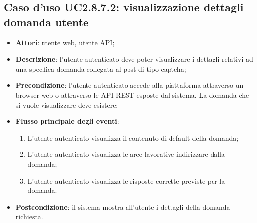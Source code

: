 \hypertarget{UC2.8.7.2}{}
\subsection{Caso d'uso UC2.8.7.2: visualizzazione dettagli domanda utente}
\begin{itemize}
\item \textbf{Attori}: utente web, utente API;
\item \textbf{Descrizione}: l'utente autenticato deve poter visualizzare i dettagli relativi ad una specifica domanda collegata al post di tipo captcha; 
      \item \textbf{Precondizione}: l'utente autenticato accede alla piattaforma attraverso un browser web o attraverso le API REST esposte dal sistema. La domanda che si vuole visualizzare deve esistere;

        \item \textbf{Flusso principale degli eventi}:
          \begin{enumerate}
          \item L'utente autenticato visualizza il contenuto di default della domanda;
          \item L'utente autenticato visualizza le aree lavorative indirizzare dalla domanda;
          \item L'utente autenticato visualizza le risposte corrette previste per la domanda.

      \end{enumerate}
    \item \textbf{Postcondizione}: il sistema mostra all'utente i dettagli della domanda richiesta.
  \end{itemize}
\hypertarget{UC2.8.7.3}{}
